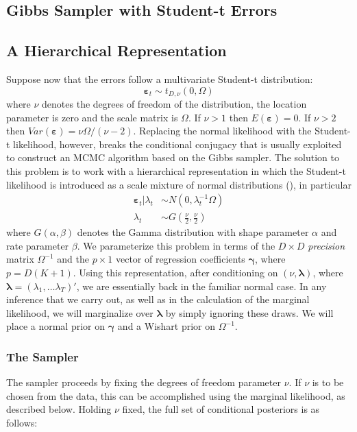 \documentclass[12pt]{article}
\begin{document}
\subsection{Gibbs Sampler with Student-t Errors}

\subsection{A Hierarchical Representation}
Suppose now that the errors follow a multivariate Student-t distribution: 
\begin{equation*}
\boldsymbol{\varepsilon}_{t}\sim t_{D,\nu }\left( 0,\Omega \right)
\end{equation*}
where $\nu$ denotes the degrees of freedom of the distribution, the location parameter is zero and the scale matrix is $\Omega$.
If $\nu >1$ then $E(\boldsymbol{\varepsilon}) = 0$. 
If $\nu>2$ then $Var\left( \boldsymbol{\varepsilon} \right) = \nu \Omega/(\nu-2)$.
Replacing the normal likelihood with the Student-t likelihood, however, breaks the conditional conjugacy that is usually exploited to construct an MCMC algorithm based on the Gibbs sampler.
The solution to this problem is to work with a hierarchical representation in which the Student-t likelihood is introduced as a scale mixture of normal distributions (\cite{chib1995hierarchical}), in particular
\begin{align*}
\boldsymbol{\varepsilon}_{t}|\lambda _{t} &\sim N\left( 0,\lambda _{t}^{-1}\Omega \right)
\\
\lambda _{t} &\sim G\left( \frac{\nu }{2},\frac{\nu }{2}\right)
\end{align*}
where $G(\alpha,\beta)$ denotes the Gamma distribution with shape parameter $\alpha$ and rate parameter $\beta$. We parameterize this problem in terms of the $D\times D$ \emph{precision} matrix $\Omega^{-1}$ and the $p\times1$ vector of regression coefficients $\boldsymbol{\gamma}$, where $p = D(K+1)$. 
Using this representation, after conditioning on $\left( \nu, \boldsymbol{\lambda} \right)$, where $\boldsymbol{\lambda} = (\lambda_1, \dots \lambda_T)'$, we are essentially back in the familiar normal case.
In any inference that we carry out, as well as in the calculation of the marginal likelihood, we will marginalize over $\boldsymbol{\lambda}$ by simply ignoring these draws.
We will place a normal prior on $\boldsymbol{\gamma}$ and a Wishart prior on $\Omega^{-1}$. 

\subsubsection{The Sampler}
The sampler proceeds by fixing the degrees of freedom parameter $\nu$.
If $\nu$ is to be chosen from the data, this can be accomplished using the marginal likelihood, as described below.
Holding $\nu$ fixed, the full set of conditional posteriors is as follows:
\end{document}
